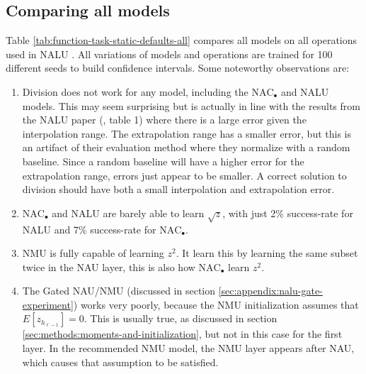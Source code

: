 \subsection{Comparing all models}
\label{sec:appendix:comparison-all-models}

Table \ref{tab:function-task-static-defaults-all} compares all models on all operations used in NALU \cite{trask-nalu}. All variations of models and operations are trained for 100 different seeds to build confidence intervals. Some noteworthy observations are:

\begin{enumerate}
    \item Division does not work for any model, including the $\mathrm{NAC}_{\bullet}$ and NALU models. This may seem surprising but is actually in line with the results from the NALU paper (\citet{trask-nalu}, table 1) where there is a large error given the interpolation range. The extrapolation range has a smaller error, but this is an artifact of their evaluation method where they normalize with a random baseline. Since a random baseline will have a higher error for the extrapolation range, errors just appear to be smaller. A correct solution to division should have both a small interpolation and extrapolation error. 
    \item $\mathrm{NAC}_{\bullet}$ and NALU are barely able to learn $\sqrt{z}$, with just 2\% success-rate for NALU and 7\% success-rate for $\mathrm{NAC}_{\bullet}$.
    \item NMU is fully capable of learning $z^2$. It learn this by learning the same subset twice in the NAU layer, this is also how $\mathrm{NAC}_{\bullet}$ learn $z^2$.
    \item The Gated NAU/NMU (discussed in section \ref{sec:appendix:nalu-gate-experiment}) works very poorly, because the NMU initialization assumes that $E[z_{h_{\ell-1}}] = 0$. This is usually true, as discussed in section \ref{sec:methods:moments-and-initialization}, but not in this case for the first layer. In the recommended NMU model, the NMU layer appears after NAU, which causes that assumption to be satisfied.
\end{enumerate}

